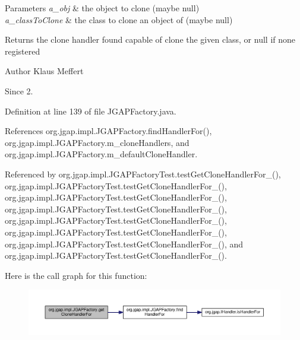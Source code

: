 \begin{DoxyParams}{Parameters}
{\em a\-\_\-obj} & the object to clone (maybe null) \\
\hline
{\em a\-\_\-class\-To\-Clone} & the class to clone an object of (maybe null) \\
\hline
\end{DoxyParams}
\begin{DoxyReturn}{Returns}
the clone handler found capable of clone the given class, or null if none registered
\end{DoxyReturn}
\begin{DoxyAuthor}{Author}
Klaus Meffert 
\end{DoxyAuthor}
\begin{DoxySince}{Since}
2. 
\end{DoxySince}


Definition at line 139 of file J\-G\-A\-P\-Factory.\-java.



References org.\-jgap.\-impl.\-J\-G\-A\-P\-Factory.\-find\-Handler\-For(), org.\-jgap.\-impl.\-J\-G\-A\-P\-Factory.\-m\-\_\-clone\-Handlers, and org.\-jgap.\-impl.\-J\-G\-A\-P\-Factory.\-m\-\_\-default\-Clone\-Handler.



Referenced by org.\-jgap.\-impl.\-J\-G\-A\-P\-Factory\-Test.\-test\-Get\-Clone\-Handler\-For\-\_(), org.\-jgap.\-impl.\-J\-G\-A\-P\-Factory\-Test.\-test\-Get\-Clone\-Handler\-For\-\_(), org.\-jgap.\-impl.\-J\-G\-A\-P\-Factory\-Test.\-test\-Get\-Clone\-Handler\-For\-\_(), org.\-jgap.\-impl.\-J\-G\-A\-P\-Factory\-Test.\-test\-Get\-Clone\-Handler\-For\-\_(), org.\-jgap.\-impl.\-J\-G\-A\-P\-Factory\-Test.\-test\-Get\-Clone\-Handler\-For\-\_(), org.\-jgap.\-impl.\-J\-G\-A\-P\-Factory\-Test.\-test\-Get\-Clone\-Handler\-For\-\_(), org.\-jgap.\-impl.\-J\-G\-A\-P\-Factory\-Test.\-test\-Get\-Clone\-Handler\-For\-\_(), and org.\-jgap.\-impl.\-J\-G\-A\-P\-Factory\-Test.\-test\-Get\-Clone\-Handler\-For\-\_().



Here is the call graph for this function\-:
\nopagebreak
\begin{figure}[H]
\begin{center}
\leavevmode
\includegraphics[width=350pt]{classorg_1_1jgap_1_1impl_1_1_j_g_a_p_factory_a17928994201f3445564d95de57455eb4_cgraph}
\end{center}
\end{figure}


